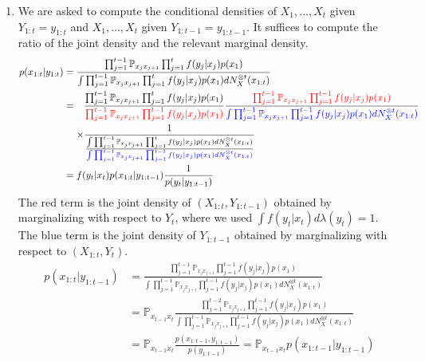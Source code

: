 \documentclass[a4paper,11pt, hidelinks]{article}
\begin{document}
\begin{enumerate}[label=(\alph*)]
	\item We are asked to compute the conditional densities of $X_1,\ldots,X_t$ given $Y_{1:t}=y_{1:t}$ and $X_1,\ldots,X_t$ given $Y_{1:t-1}=y_{1:t-1}$. It suffices to compute the ratio of the joint density and the relevant marginal density.
	$$\begin{aligned}
		p(x_{1:t}|y_{1:t}) &= \frac{\prod_{j=1}^{t-1}\mathbb P_{x_{j} x_{j+1}} \prod_{j=1}^{t}f(y_j|x_j) p(x_1)}{\int \prod_{j=1}^{t-1}\mathbb P_{x_{j} x_{j+1}} \prod_{j=1}^{t}f(y_j|x_j) p(x_1) dN_X^{\otimes t}(x_{1:t})}\\
		&= \begin{aligned}[t]&\frac{\prod_{j=1}^{t-1}\mathbb P_{x_{j} x_{j+1}} \prod_{j=1}^{t}f(y_j|x_j) p(x_1)}{\mathbin{\textcolor{red}{\prod_{j=1}^{t-1}\mathbb P_{x_{j} x_{j+1}} \prod_{j=1}^{t-1}f(y_j|x_j) p(x_1)}}}
		   \frac{\mathbin{\textcolor{red}{\prod_{j=1}^{t-1}\mathbb P_{x_{j} x_{j+1}} \prod_{j=1}^{t-1}f(y_j|x_j) p(x_1)}}}{\mathbin{\textcolor{blue}{\int \prod_{j=1}^{t-1}\mathbb P_{x_{j} x_{j+1}} \prod_{j=1}^{t-1}f(y_j|x_j) p(x_1) dN_X^{\otimes t}(x_{1:t})}}}\\ 
		   \times &\frac{1}{\frac{\int \prod_{j=1}^{t-1}\mathbb P_{x_{j} x_{j+1}} \prod_{j=1}^{t}f(y_j|x_j) p(x_1) dN_X^{\otimes t}(x_{1:t})}{\mathbin{\textcolor{blue}{\int \prod_{j=1}^{t-1}\mathbb P_{x_{j} x_{j+1}} \prod_{j=1}^{t-1}f(y_j|x_j) p(x_1) dN_X^{\otimes t}(x_{1:t})}}}} \end{aligned}\\
		&= f(y_t|x_t) p(x_{1:t}|y_{1:t-1})\frac{1}{p(y_t|y_{1:t-1})}
	\end{aligned} $$
	The red term is the joint density of $(X_{1:t},Y_{1:t-1})$ obtained by marginalizing with respect to $Y_t$, where we used $\int f(y_t|x_t) d\lambda(y_t)= 1$. The blue term is the joint density of $Y_{1:t-1}$ obtained by marginalizing with respect to $(X_{1:t}, Y_t)$.
	$$\begin{aligned}
		p(x_{1:t}|y_{1:t-1}) &= \frac{\prod_{j=1}^{t-1}\mathbb P_{x_{j} x_{j+1}} \prod_{j=1}^{t-1}f(y_j|x_j) p(x_1)}{\int \prod_{j=1}^{t-1}\mathbb P_{x_{j} x_{j+1}} \prod_{j=1}^{t-1}f(y_j|x_j) p(x_1) dN_X^{\otimes t}(x_{1:t})}\\
		&= \mathbb P_{x_{t-1} x_t} \frac{\prod_{j=1}^{t-2}\mathbb P_{x_{j} x_{j+1}} \prod_{j=1}^{t-1}f(y_j|x_j) p(x_1)}{\int \prod_{j=1}^{t-1}\mathbb P_{x_{j} x_{j+1}} \prod_{j=1}^{t-1}f(y_j|x_j) p(x_1) dN_X^{\otimes t}(x_{1:t})}\\
		&= \mathbb P_{x_{t-1} x_t} \frac{p(x_{1:t-1}, y_{1:t-1})}{p(y_{1:t-1})} = \mathbb P_{x_{t-1}x_t}p(x_{1:t-1}|y_{1:t-1})
	\end{aligned} $$


\end{enumerate}
\end{document}
